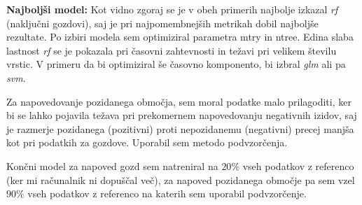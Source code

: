 \documentclass[12pt]{article}
\begin{document}
\textbf{Najboljši model:}
Kot vidno zgoraj se je v obeh primerih najbolje izkazal \emph{rf} (naključni gozdovi), saj je pri najpomembnejših metrikah dobil najboljše 
rezultate. Po izbiri modela sem optimiziral parametra mtry in ntree. Edina slaba lastnost \emph{rf} se je pokazala 
pri časovni zahtevnosti in težavi pri velikem številu vrstic. V primeru da bi optimiziral še časovno
komponento, bi izbral \emph{glm} ali pa \emph{svm}.

Za napovedovanje pozidanega območja, sem moral podatke malo prilagoditi, ker bi se lahko pojavila težava
pri prekomernem napovedovanju negativnih izidov, saj je razmerje pozidanega (pozitivni) proti nepozidanemu 
(negativni) precej manjša kot pri podatkih za gozdove. Uporabil sem metodo  podvzorčenja.

Končni model za napoved gozd sem natreniral na $20\%$ vseh podatkov z referenco (ker mi računalnik ni 
dopuščal več), za napoved pozidanega območje pa sem vzel $90\%$ vseh podatkov z referenco na katerih sem uporabil 
podvzorčenje.
\end{document}
